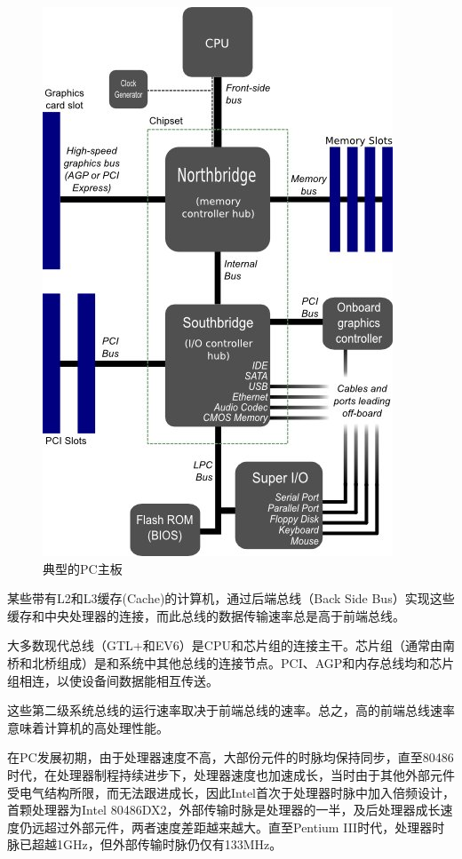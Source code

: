 \begin{figure}[htb]
\centering
\includegraphics[keepaspectratio,width=0.5\paperwidth]{Pictures/Motherboard_diagram.jpg}
\caption{典型的PC主板}
\label{fig:mainboard}
\end{figure}
某些带有L2和L3缓存(Cache)的计算机，通过后端总线（Back Side Bus）实现这些缓存和中央处理器的连接，而此总线的数据传输速率总是高于前端总线。

大多数现代总线（GTL+和EV6）是CPU和芯片组的连接主干。芯片组（通常由南桥和北桥组成）是和系统中其他总线的连接节点。PCI、AGP和内存总线均和芯片组相连，以使设备间数据能相互传送。

这些第二级系统总线的运行速率取决于前端总线的速率。总之，高的前端总线速率意味着计算机的高处理性能。

在PC发展初期，由于处理器速度不高，大部份元件的时脉均保持同步，直至80486时代，在处理器制程持续进步下，处理器速度也加速成长，当时由于其他外部元件受电气结构所限，而无法跟进成长，因此Intel首次于处理器时脉中加入倍频设计，首颗处理器为Intel 80486DX2，外部传输时脉是处理器的一半，及后处理器成长速度仍远超过外部元件，两者速度差距越来越大。直至Pentium III时代，处理器时脉已超越1GHz，但外部传输时脉仍仅有133MHz。

